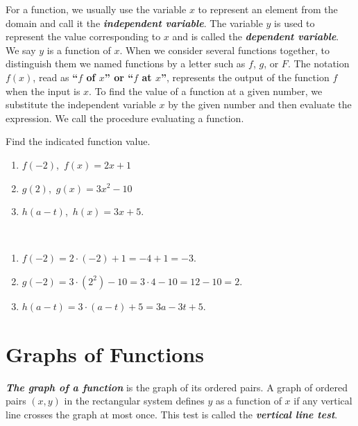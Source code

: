 \documentclass[en,12pt]{elegantbook}
\providecommand{\tightlist}{%
  \setlength{\itemsep}{0pt}\setlength{\parskip}{0pt}}
\let\BeginKnitrBlock\begin \let\EndKnitrBlock\end
\begin{document}
For a function, we usually use the variable \(x\) to represent an element from the domain and call it the \textbf{\emph{independent variable}}. The variable \(y\) is used to represent the value corresponding to \(x\) and is called the \textbf{\emph{dependent variable}}. We say \(y\) is a function of \(x\). When we consider several functions together, to distinguish them we named functions by a letter such as \(f\), \(g\), or \(F\). The notation \(f(x)\), read as \textbf{``\(f\) of \(x\)'' or ``\(f\) at \(x\)''}, represents the output of the function \(f\) when the input is \(x\).
To find the value of a function at a given number, we substitute the independent variable \(x\) by the given number and then evaluate the expression. We call the procedure evaluating a function.

\BeginKnitrBlock{example}
\protect\hypertarget{exm:unnamed-chunk-247}{}{\label{exm:unnamed-chunk-247} }
Find the indicated function value.

\begin{enumerate}
\def\labelenumi{\arabic{enumi}.}
\tightlist
\item
  \(f(-2)\),~\(f(x)=2x+1\)
\item
  \(g(2)\),~\(g(x)=3x^2-10\)
\item
  \(h(a-t)\),~\(h(x)=3x+5\).
\end{enumerate}
\EndKnitrBlock{example}

\BeginKnitrBlock{solution}
{}\\

\begin{enumerate}
\def\labelenumi{\arabic{enumi}.}
\tightlist
\item
  \(f(-2)=2\cdot(-2)+1=-4+1=-3\).
\item
  \(g(-2)=3\cdot(2^2)-10=3\cdot 4-10=12-10=2\).
\item
  \(h(a-t)=3\cdot(a-t)+5=3a-3t+5\).
\end{enumerate}
\EndKnitrBlock{solution}

\hypertarget{graphs-of-functions}{%
\section{Graphs of Functions}\label{graphs-of-functions}}

\textbf{\emph{The graph of a function}} is the graph of its ordered pairs.
A graph of ordered pairs \((x,y)\) in the rectangular system defines \(y\) as a function of \(x\) if any vertical line crosses the graph at most once. This test is called the \textbf{\emph{vertical line test}}.
\end{document}
